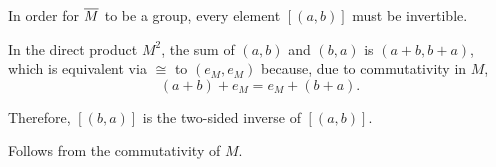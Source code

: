 \begin{defproof}
   In order for \( \oline M \) to be a group, every element \( [(a, b)] \) must be invertible.

  In the direct product \( M^2 \), the sum of \( (a, b) \) and \( (b, a) \) is \( (a + b, b + a) \), which is equivalent via \( {\cong} \) to \( (e_M, e_M) \) because, due to commutativity in \( M \),
  \begin{equation*}
    (a + b) + e_M = e_M + (b + a).
  \end{equation*}

  Therefore, \( [(b, a)] \) is the two-sided inverse of \( [(a, b)] \).

   Follows from the commutativity of \( M \).
\end{defproof}


